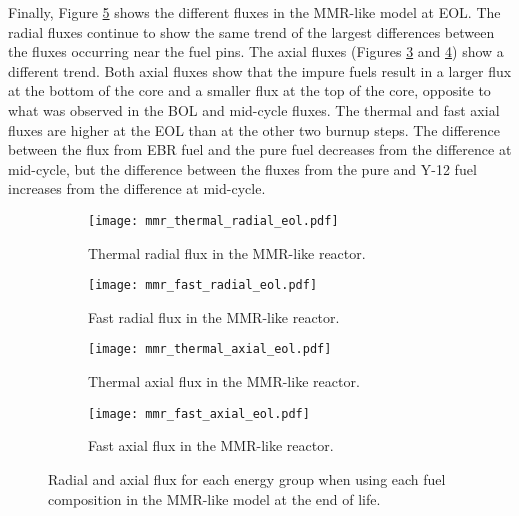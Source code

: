 Finally, Figure \ref{fig:mmr_eol} shows the different fluxes in the 
\gls{MMR}-like model at \gls{EOL}. The radial fluxes continue to show 
the same trend of the largest differences between the fluxes occurring near
the fuel pins. The axial fluxes (Figures \ref{fig:mmr_thermal_axial_eol} and 
\ref{fig:mmr_fast_axial_eol}) show a different trend. Both axial 
fluxes show that the impure fuels result in a larger flux at the 
bottom of the core and a smaller flux at the top of the core, opposite
to what was observed in the \gls{BOL} and mid-cycle fluxes. The thermal 
and fast axial fluxes are higher at the \gls{EOL} than at the other 
two burnup steps. The difference between the flux from \gls{EBR} fuel 
and the pure fuel decreases from the difference at mid-cycle, but the 
difference between the fluxes from the pure and Y-12 fuel 
increases from the difference at mid-cycle. 
   
\begin{figure}
        \centering
        \begin{subfigure}[b]{0.48\textwidth}
            \centering
            \texttt{[image: mmr\_thermal\_radial\_eol.pdf]}
            \caption{Thermal radial flux in the \gls{MMR}-like reactor.}
            \label{fig:mmr_thermal_radial_eol}
        \end{subfigure}
        \hfill
        \begin{subfigure}[b]{0.48\textwidth}
            \centering
            \texttt{[image: mmr\_fast\_radial\_eol.pdf]}
            \caption{Fast radial flux in the \gls{MMR}-like reactor.}
            \label{fig:mmr_fast_radial_eol}
        \end{subfigure}
        \hfill
            
        \begin{subfigure}[b]{0.48\textwidth}
            \centering
            \texttt{[image: mmr\_thermal\_axial\_eol.pdf]}
            \caption{Thermal axial flux in the \gls{MMR}-like reactor. }
            \label{fig:mmr_thermal_axial_eol}
        \end{subfigure}
        \hfill
        \begin{subfigure}[b]{0.48\textwidth}
            \centering
            \texttt{[image: mmr\_fast\_axial\_eol.pdf]}
            \caption{Fast axial flux in the \gls{MMR}-like reactor.}
            \label{fig:mmr_fast_axial_eol}
        \end{subfigure}
        \hfill
        \caption{Radial and axial flux for each energy group when using 
        each fuel composition in the \gls{MMR}-like model at the end 
        of life.}
        \label{fig:mmr_eol}
   \end{figure}


